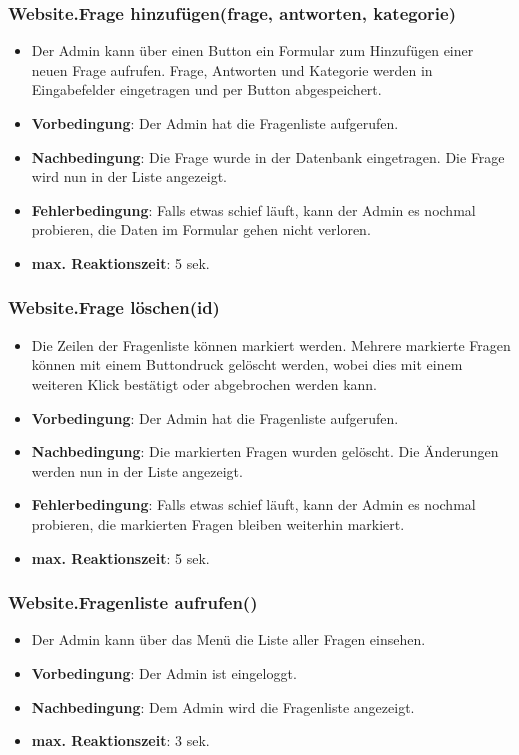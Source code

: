 \documentclass[fontsize=12pt,paper=a4,twoside]{scrartcl}
\begin{document}
\subsubsection{Website.Frage hinzufügen(frage, antworten, kategorie)}
\begin{itemize}
\item Der Admin kann über einen Button ein Formular zum Hinzufügen einer neuen Frage aufrufen. Frage, Antworten und Kategorie werden in Eingabefelder eingetragen und per Button abgespeichert.
\item \textbf{Vorbedingung}: Der Admin hat die Fragenliste aufgerufen.
\item \textbf{Nachbedingung}: Die Frage wurde in der Datenbank eingetragen. Die Frage wird nun in der Liste angezeigt.
\item \textbf{Fehlerbedingung}: Falls etwas schief läuft, kann der Admin es nochmal probieren, die Daten im Formular gehen nicht verloren.
\item \textbf{max. Reaktionszeit}: 5 sek.
\end{itemize}

\subsubsection{Website.Frage löschen(id)}
\begin{itemize}
\item Die Zeilen der Fragenliste können markiert werden. Mehrere markierte Fragen können mit einem Buttondruck gelöscht werden, wobei dies mit einem weiteren Klick bestätigt oder abgebrochen werden kann.
\item \textbf{Vorbedingung}: Der Admin hat die Fragenliste aufgerufen.
\item \textbf{Nachbedingung}: Die markierten Fragen wurden gelöscht. Die Änderungen werden nun in der Liste angezeigt.
\item \textbf{Fehlerbedingung}: Falls etwas schief läuft, kann der Admin es nochmal probieren, die markierten Fragen bleiben weiterhin markiert.
\item \textbf{max. Reaktionszeit}: 5 sek.
\end{itemize}

\subsubsection{Website.Fragenliste aufrufen()}
\begin{itemize}
\item Der Admin kann über das Menü die Liste aller Fragen einsehen.
\item \textbf{Vorbedingung}: Der Admin ist eingeloggt.
\item \textbf{Nachbedingung}: Dem Admin wird die Fragenliste angezeigt. 
\item \textbf{max. Reaktionszeit}: 3 sek.
\end{itemize}
\end{document}
